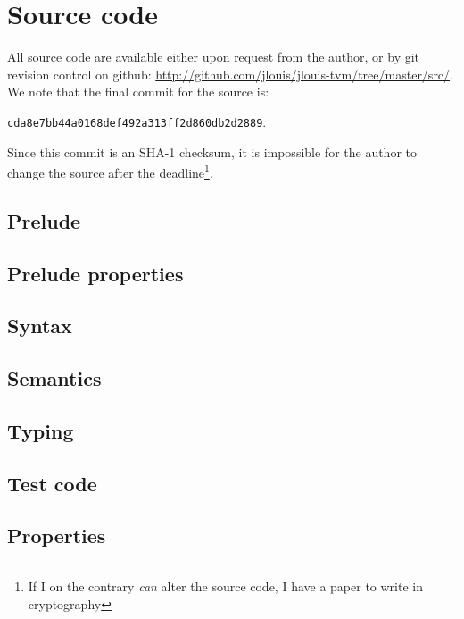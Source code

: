 \documentclass[a4paper, oneside, 10pt, draft]{memoir}
\begin{document}


\appendix
\chapter{Source code}
All source code are available either upon request from the author, or
by git revision control on github:
\url{http://github.com/jlouis/jlouis-tvm/tree/master/src/}. We note
that the final commit for the source is:
\begin{center}
  \texttt{cda8e7bb44a0168def492a313ff2d860db2d2889}.
\end{center}
Since this commit is an SHA-1 checksum, it is impossible for the
author to change the source after the deadline\footnote{If I on the
  contrary \emph{can} alter the source code, I have a paper to write
  in cryptography}.

\section{Prelude}
\section{Prelude properties}
\section{Syntax}
\section{Semantics}
\section{Typing}
\section{Test code}
\section{Properties}
\end{document}
